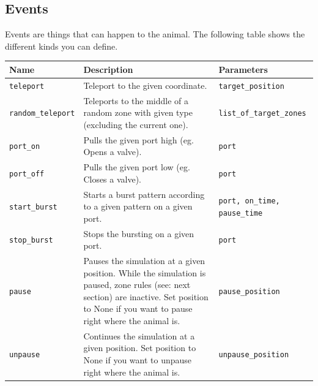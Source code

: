 \documentclass[11pt,a4paper]{article}
\begin{document}
\subsection{Events}
Events are things that can happen to the animal. The following table shows the different kinds you
can define.\\


\begin{tabularx}{\textwidth}{|p{3.1cm}|X|p{4cm}|}
\hline 
\rule[-1ex]{0pt}{2.5ex} 
\textbf{Name} & \textbf{Description} & \textbf{Parameters} \\ 

\hline 
\rule[-1ex]{0pt}{2.5ex} 
\texttt{teleport} & Teleport to the given coordinate. & \texttt{target\_position} \\ 

\hline 
\rule[-1ex]{0pt}{2.5ex} 
\texttt{random\_teleport} & Teleports to the middle of a random zone with given type (excluding the current one). & \texttt{list\_of\_target\_zones} \\ 

\hline 
\rule[-1ex]{0pt}{2.5ex} 
\texttt{port\_on} & Pulls the given port high
(eg. Opens a valve). & \texttt{port} \\ 

\hline 
\rule[-1ex]{0pt}{2.5ex} \texttt{port\_off} & Pulls the given port low (eg. Closes a valve). & \texttt{port} \\ 

\hline 
\rule[-1ex]{0pt}{2.5ex} 
\texttt{start\_burst} & Starts a burst pattern according to a given pattern on a given port. & \texttt{port, on\_time, pause\_time} \\ 

\hline 
\rule[-1ex]{0pt}{2.5ex} 
\texttt{stop\_burst} & Stops the bursting on a given port. & \texttt{port} \\ 

\hline 
\rule[-1ex]{0pt}{2.5ex} 
\texttt{pause} & Pauses the simulation at a given position. While the simulation is paused, zone rules (see: next section) are inactive. Set position to None if you want to pause right where the animal is. & \texttt{pause\_position} \\ 

\hline 
\rule[-1ex]{0pt}{2.5ex} 
\texttt{unpause} & Continues the simulation at a given position. Set position to None if you want to unpause right where the animal is. & \texttt{unpause\_position} \\ 

\hline 
\end{tabularx} 
\end{document}
